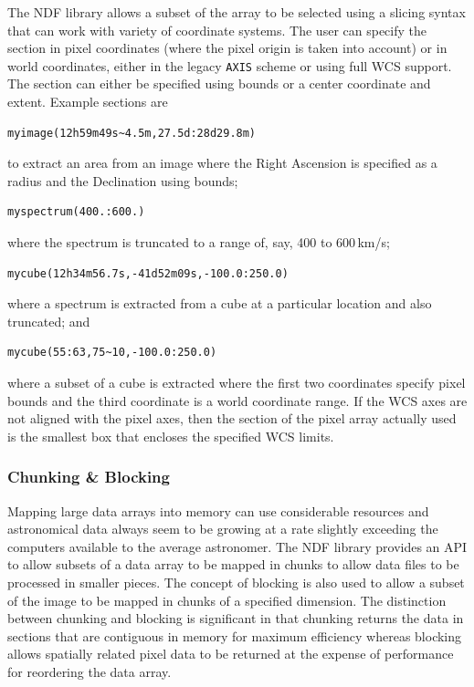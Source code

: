 \documentclass[final,authoryear,5p,times,twocolumn]{elsarticle}
\begin{document}
The NDF library allows a subset of the array to be selected using a
slicing syntax that can work with variety of coordinate systems. The
user can specify the section in pixel coordinates (where the pixel
origin is taken into account) or in world coordinates, either in the
legacy \texttt{AXIS} scheme or using full WCS support. The section can
either be specified using bounds or a center coordinate and
extent. Example sections are
\begin{verbatim}
myimage(12h59m49s~4.5m,27.5d:28d29.8m)
\end{verbatim}
to extract an area from an image where the Right Ascension is
specified as a radius and the Declination using bounds;
\begin{verbatim}
myspectrum(400.:600.)
\end{verbatim}
where the spectrum is truncated to a range of, say, 400 to 600\,km/s;
\begin{verbatim}
mycube(12h34m56.7s,-41d52m09s,-100.0:250.0)
\end{verbatim}
where a spectrum is extracted from a cube at a particular location and
also truncated; and
\begin{verbatim}
mycube(55:63,75~10,-100.0:250.0)
\end{verbatim}
where a subset of a cube is extracted where the first two coordinates
specify pixel bounds and the third coordinate is a world coordinate
range. If the WCS axes are not aligned with the pixel axes, then the
section of the pixel array actually used is the smallest box that
encloses the specified WCS limits.

\subsubsection{Chunking \& Blocking}

Mapping large data arrays into memory can use considerable resources
and astronomical data always seem to be growing at a rate slightly
exceeding the computers available to the average astronomer. The NDF
library provides an API to allow subsets of a data array to be mapped
in chunks to allow data files to be processed in smaller pieces. The
concept of blocking is also used to allow a subset of the image to be
mapped in chunks of a specified dimension. The distinction between
chunking and blocking is significant in that chunking returns the data
in sections that are contiguous in memory for maximum efficiency
whereas blocking allows spatially related pixel data to be returned at
the expense of performance for reordering the data array.
\end{document}
